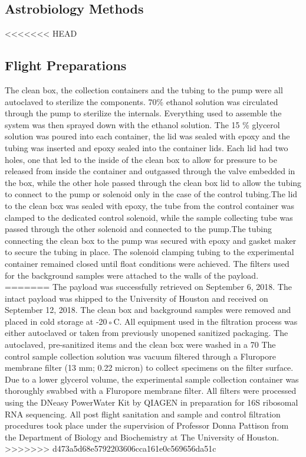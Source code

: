 \subsection{Astrobiology Methods}
\label{sec:Astrobiology Methods}
<<<<<<< HEAD
\subsection{ Flight Preparations }
 The clean box, the collection containers and the tubing to the pump were all autoclaved to sterilize the components. 70\% ethanol solution was circulated through the pump to sterilize the internals. Everything used to assemble the system was then sprayed down with the ethanol solution. The  15 \% glycerol solution was poured into each container, the lid was sealed with epoxy and the tubing was inserted and epoxy sealed into the container lids. Each lid had two holes, one that led to the inside of the clean box to allow for pressure to be released from inside the container and outgassed  through the valve embedded in the box, while the other hole passed through the clean box lid to allow the tubing to connect to the pump or solenoid only in the case of the control tubing.The lid to the clean box was sealed with epoxy, the tube from the control container was clamped to the dedicated control solenoid, while the sample collecting tube was passed through the other solenoid and connected to the pump.The tubing connecting the clean box to the pump was secured with epoxy and gasket maker to secure the tubing in place. The solenoid clamping tubing to the experimental container remained closed until float conditions were achieved.  The filters used for the background samples were attached to the walls of the payload.
=======
The payload was successfully retrieved on September 6, 2018. The intact payload was shipped to the University of Houston and received on September 12, 2018. The clean box and background samples were removed and placed in cold storage at -20◦C. All equipment used in the filtration process was either autoclaved or taken from previously unopened sanitized packaging. The autoclaved, pre-sanitized items and the clean box were washed in a 70 %
The control sample collection solution was vacuum filtered through a Fluropore membrane filter (13 mm; 0.22 micron) to collect specimens on the filter surface. Due to a lower glycerol volume, the experimental sample collection container was thoroughly swabbed with a Fluropore membrane filter. All filters were processed using the DNeasy PowerWater Kit by QIAGEN in preparation for 16S ribosomal RNA sequencing. All post flight sanitation and sample and control filtration procedures took place under the supervision of Professor Donna Pattison from the Department of Biology and Biochemistry at The University of Houston.
>>>>>>> d473a5d68e5792203606cca161e0c569656da51c
